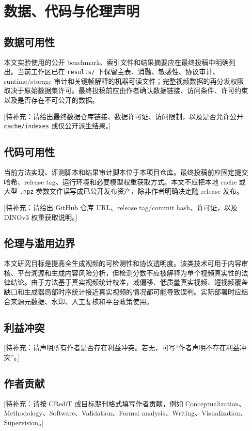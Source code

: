 \section*{数据、代码与伦理声明}
\label{sec:declarations}

\subsection*{数据可用性}
本文实验使用的公开 benchmark、索引文件和结果摘要应在最终投稿中明确列出。当前工作区已在 \texttt{results/} 下保留主表、消融、敏感性、协议审计、runtime/storage 审计和关键帧解释的机器可读文件；完整视频数据的再分发权限取决于原始数据集许可。最终投稿前应由作者确认数据链接、访问条件、许可约束以及是否存在不可公开的数据。

[待补充：请给出最终数据仓库链接、数据许可证、访问限制，以及是否允许公开 \texttt{cache/indexes} 或仅公开派生结果。]

\subsection*{代码可用性}
当前方法实现、评测脚本和结果审计脚本位于本项目仓库。最终投稿前应固定提交哈希、release tag、运行环境和必要模型权重获取方式。本文不应把本地 cache 或大型 \texttt{.npz} 参数文件误写成已公开发布资产，除非作者明确决定随 release 发布。

[待补充：请给出 GitHub 仓库 URL、release tag/commit hash、许可证，以及 DINOv3 权重获取说明。]

\subsection*{伦理与滥用边界}
本文研究目标是提高全生成视频的可检测性和协议透明度。该类技术可用于内容审核、平台溯源和生成内容风险分析，但检测分数不应被解释为单个视频真实性的法律结论。由于方法基于真实视频统计校准，域偏移、低质量真实视频、短视频覆盖缺口和生成器局部时序统计接近真实视频的情况都可能导致误判。实际部署时应结合来源元数据、水印、人工复核和平台政策使用。

\subsection*{利益冲突}
[待补充：请声明所有作者是否存在利益冲突。若无，可写“作者声明不存在利益冲突”。]

\subsection*{作者贡献}
[待补充：请按 CRediT 或目标期刊格式填写作者贡献，例如 Conceptualization、Methodology、Software、Validation、Formal analysis、Writing、Visualization、Supervision。]
